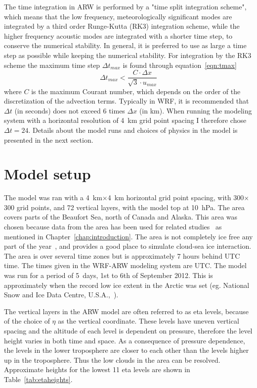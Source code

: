 The time integration in ARW is performed by a "time split integration scheme", which means that the low frequency, meteorologically significant modes are integrated by a third order Runge-Kutta (RK3) integration scheme, while the higher frequency acoustic modes are integrated with a shorter time step, to conserve the numerical stability. In general, it is preferred to use as large a time step as possible while keeping the numerical stability. For integration by the RK3 scheme the maximum time step $\Delta t_{max}$ is found through equation~\ref{eqn:tmax}
\begin{equation}
\Delta t_{max} < \frac{C\cdot \Delta x}{\sqrt{3}\cdot u_{max}}
\label{eqn:tmax}
\end{equation}
where $C$ is the maximum Courant number, which depends on the order of the discretization of the advection terms. Typically in WRF, it is recommended that $\Delta t$ (in seconds) does not exceed 6 times $\Delta x$ (in km). When running the modeling system with a horizontal resolution of 4~km grid point spacing I therefore chose $\Delta t = 24$. Details about the model runs and choices of physics in the model is presented in the next section.

\section{Model setup}
\label{sec:modelsetup}
The model was ran with a 4~km$\times$4~km horizontal grid point spacing, with 300$\times$300 grid points, and 72 vertical layers, with the model top at 10~hPa.
The area covers parts of the Beaufort Sea, north of Canada and Alaska. This area was chosen because data from the area has been used for related studies~\citep{Shupe2004,Kay2009,Wu2012,Palm2010,Schweiger2008,Eastman2010a} as mentioned in Chapter~\ref{chap:introduction}. The area is not completely ice free any part of the year~\citep{NSIDC}, and provides a good place to simulate cloud-sea ice interaction. The area is over several time zones but is approximately 7 hours behind UTC time. The times given in the WRF-ARW modeling system are UTC. The model was run for a period of 5~days, 1st to 6th of September 2012. This is approximately when the record low ice extent in the Arctic was set (eg. National Snow and Ice Data Centre, U.S.A.,~\citep{NSIDC}).

The vertical layers in the ARW model are often referred to as eta levels, because of the choice of $\eta$ as the vertical coordinate. These levels have uneven vertical spacing and the altitude of each level is dependent on pressure, therefore the level height varies in both time and space. As a consequence of pressure dependence, the levels in the lower troposphere are closer to each other than the levels higher up in the troposphere. Thus the low clouds in the area can be resolved. Approximate heights for the lowest 11 eta levels are shown in Table~\ref{tab:etaheights}.

